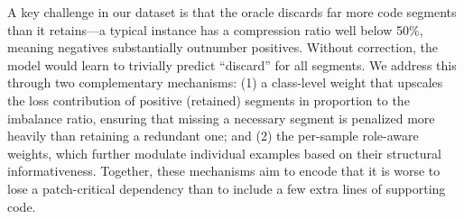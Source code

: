\documentclass[sigconf,nonacm]{acmart}
\newcommand{\projName}{\textsc{SWEzze}\xspace}
\begin{document}
A key challenge in our dataset is that the oracle discards far more code segments than it retains---a typical instance has a compression ratio well below 50\%, meaning negatives substantially outnumber positives. Without correction, the model would learn to trivially predict ``discard'' for all segments. We address this through two complementary mechanisms: (1) a class-level weight that upscales the loss contribution of positive (retained) segments in proportion to the imbalance ratio, ensuring that missing a necessary segment is penalized more heavily than retaining a redundant one; and (2) the per-sample role-aware weights, which further modulate individual examples based on their structural informativeness. Together, these mechanisms aim to encode that it is worse to lose a patch-critical dependency than to include a few extra lines of supporting code.





\end{document}
